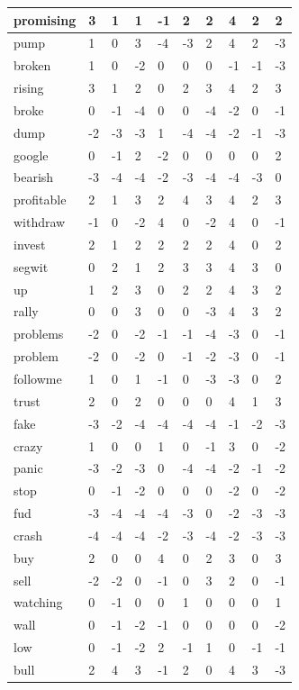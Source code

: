 \documentclass[a4paper,11pt,oneside]{article}
\begin{document}
\begin{center}
\begin{longtable}{| l | l | l | l | l | l | l | l | l | l |}
  		\hline
  		promising & 3&1&1&-1&2&2&4&2&2 \\
  		\hline
  		pump & 1&0&3&-4&-3&2&4&2&-3 \\
  		\hline
  		broken & 1&0&-2&0&0&0&-1&-1&-3 \\
  		\hline
  		rising & 3&1&2&0&2&3&4&2&3 \\
  		\hline
  		broke & 0  &-1&-4&0&0&-4&-2&0&-1 \\
  		\hline
  		dump & -2&-3&-3&1&-4&-4&-2&-1&-3 \\
  		\hline
  		google & 0  &-1&2&-2&0&0&0&0&2 \\
  		\hline
  		bearish & -3&-4&-4&-2&-3&-4&-4&-3&0   \\
  		\hline
  		profitable & 2&1&3&2&4&3&4&2&3 \\
  		\hline
  		withdraw & -1&0&-2&4&0&-2&4&0&-1 \\
  		\hline
  		invest & 2&1&2&2&2&2&4&0&2 \\
  		\hline
  		segwit & 0&2&1&2&3&3&4&3&0   \\
  		\hline
  		up & 1&2&3&0&2&2&4&3&2 \\
  		\hline
  		rally & 0&0&3&0&0&-3&4&3&2 \\
  		\hline
  		problems & -2&0&-2&-1&-1&-4&-3&0&-1 \\
  		\hline
  		problem & -2&0&-2&0&-1&-2&-3&0&-1 \\
  		\hline
  		followme & 1&0&1&-1&0&-3&-3&0&2 \\
  		\hline
  		trust & 2&0&2&0&0&0&4&1&3 \\
  		\hline
  		fake & -3&-2&-4&-4&-4&-4&-1&-2&-3 \\
  		\hline
  		crazy & 1&0&0&1&0&-1&3
  		&0  
  		&-2 \\
  		\hline
  		panic & -3&-2&-3&0&-4&-4&-2&-1&-2 \\
  		\hline
  		stop & 0&-1&-2&0&0&0&-2&0&-2 \\
  		\hline
  		fud & -3&-4&-4&-4&-3&0&-2&-3&-3 \\
  		\hline
  		crash & -4&-4&-4&-2&-3&-4&-2&-3&-3 \\
  		\hline
  		buy & 2&0&0&4&0&2&3&0&3 \\
  		\hline
  		sell & -2&-2&0&-1&0&3&2&0&-1 \\
  		\hline
  		watching & 0&-1&0&0&1&0&0&0&1 \\
  		\hline
  		wall & 0&-1&-2&-1&0&0&0&0&-2 \\
  		\hline
  		low & 0&-1&-2&2&-1&1&0&-1&-1 \\
  		\hline
  		bull & 2&4&3&-1&2&0&4&3&-3 \\

\end{longtable}
\end{center}
\end{document}

